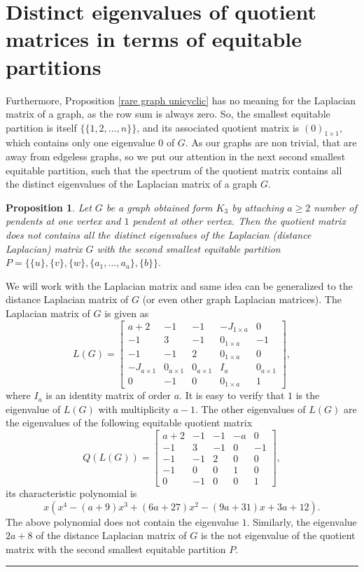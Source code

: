 \documentclass[12pt,twoside]{article}
\renewenvironment{proof}{{\noindent\bfseries Proof.}}{\qed}
\newtheorem{proposition}[theorem]{Proposition}
\def\qed{\nolinebreak\hfill\rule{.2cm}{.2cm}\par\addvspace{.5cm}}
\begin{document}
\section{Distinct eigenvalues of quotient matrices in terms of equitable partitions} \label{section 6}
Furthermore, Proposition \ref{rare graph unicyclic} has no meaning for the Laplacian matrix of a graph, as the row sum is always zero. So, the smallest equitable partition is itself $\{\{1,2,\dots,n\}\}$, and its associated quotient matrix is $(0)_{1\times 1} $, which contains only one eigenvalue $0$ of $G.$ As our graphs are non trivial, that are away from edgeless graphs, so we put our attention in the next second smallest equitable partition, such that the spectrum of the quotient matrix contains all the distinct eigenvalues of the Laplacian matrix of a graph $G.$



\begin{proposition}\label{rare graph unicyclic Laplacian}
	Let $G$ be a graph obtained form $K_{3}$ by attaching $a\geq 2$ number of pendents at one vertex and $1$ pendent at other vertex. Then the quotient matrix does not contains all the distinct eigenvalues of the Laplacian (distance Laplacian) matrix $G$ with the second smallest equitable partition $P=\{\{u\},\{v\},\{w\}, \{a_{1},\dots,a_{a}\},\{b\}\}.$
\end{proposition}
\begin{proof}
	We will work with the Laplacian matrix and same idea can be generalized to the distance Laplacian matrix of $G$ (or even other graph Laplacian matrices). The Laplacian matrix of $G$ is given as
	$$ L(G)=\begin{bmatrix}
		a+2 & -1 & -1 & -J_{1\times a} & 0\\
		-1 & 3 & -1 & 0_{1\times a} & -1\\
		-1 & -1 &  2 & 0_{1\times a} & 0\\
		-J_{a\times 1} &  0_{a\times 1}  & 0_{a\times 1} &  I_{a} & 0_{a \times 1}\\
		0 &  -1 & 0 & 0_{1\times a} & 1
	\end{bmatrix}, $$
	where $I_{a}$ is an identity matrix of order $a.$
	It is easy to verify that $1$ is the eigenvalue of $L(G)$ with multiplicity $a-1$. The other eigenvalues of $L(G)$ are the eigenvalues of the following equitable quotient matrix
	$$ Q(L(G))=\begin{bmatrix}
		a+2 & -1 & -1 & -a & 0\\
		-1 & 3 & -1 & 0 & -1\\
		-1 & -1 &  2 & 0 & 0\\
		-1 &  0  & 0 &  1 & 0\\
		0 &  -1 & 0 & 0 & 1
	\end{bmatrix}, $$
	its characteristic polynomial is $$x(x^{4}-(a+9) x^3+(6 a+27) x^2-(9 a+31) x+3 a+12). $$
	The above polynomial does not contain the eigenvalue $1$. Similarly, the eigenvalue $2a+8$ of the distance Laplacian matrix of $G$ is the not eigenvalue of the quotient matrix  with the second smallest equitable partition $P.$
\end{proof}
\end{document}
